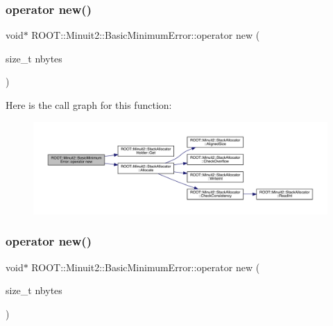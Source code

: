 \subsubsection{\texorpdfstring{operator new()}{operator new()}\hspace{0.1cm}{\footnotesize\ttfamily [1/3]}}
{\footnotesize\ttfamily void$\ast$ R\+O\+O\+T\+::\+Minuit2\+::\+Basic\+Minimum\+Error\+::operator new (\begin{DoxyParamCaption}\item[{size\+\_\+t}]{nbytes }\end{DoxyParamCaption})\hspace{0.3cm}{\ttfamily [inline]}}

Here is the call graph for this function\+:
\nopagebreak
\begin{figure}[H]
\begin{center}
\leavevmode
\includegraphics[width=350pt]{d9/ddd/classROOT_1_1Minuit2_1_1BasicMinimumError_a722b14848c4cb4144f4ba7cdf90e5ef3_cgraph}
\end{center}
\end{figure}
\mbox{\label{classROOT_1_1Minuit2_1_1BasicMinimumError_a722b14848c4cb4144f4ba7cdf90e5ef3}} 
\subsubsection{\texorpdfstring{operator new()}{operator new()}\hspace{0.1cm}{\footnotesize\ttfamily [2/3]}}
{\footnotesize\ttfamily void$\ast$ R\+O\+O\+T\+::\+Minuit2\+::\+Basic\+Minimum\+Error\+::operator new (\begin{DoxyParamCaption}\item[{size\+\_\+t}]{nbytes }\end{DoxyParamCaption})\hspace{0.3cm}{\ttfamily [inline]}}

